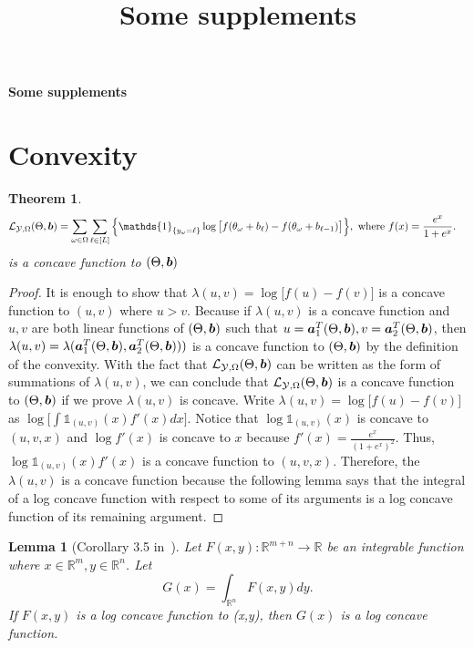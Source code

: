 \documentclass[11pt]{article}
\title{Some supplements}
\theoremstyle{plain}
\newtheorem{thm}{Theorem}[section]
\newtheorem{lem}{Lemma}
\theoremstyle{definition}
\begin{document}
\begin{center}
\begin{spacing}{1.5}
\textbf{\Large Some supplements}
\end{spacing}
\end{center}
\section{Convexity}
\begin{thm}
\begin{align}
 \logl(\Theta, \mb)&=\sum_{\omega\in\Omega}\sum_{\ell\in[L]} \Big\{\mathds{1}_{\{y_\omega=\ell\}} \log \big[f(\theta_\omega+b_\ell)-  f(\theta_\omega+b_{\ell-1})\big]\Big\}, \text{ where } f(x) = \frac{e^x}{1+e^x}.
 \end{align}
is a concave function to $(\Theta,\bm{b})$
\end{thm}
\begin{proof}
It is enough to show that $\lambda(u,v) = \log \big[f(u)-  f(v)\big]$
is a concave function to $(u,v)$ where $u>v$. Because if $\lambda(u,v)$ is a concave function and $u,v$ are both linear functions of $(\Theta,\bm{b}) $ such that $u = \bm{a}_1^T(\Theta,\bm{b}), v = \bm{a}_2^T(\Theta,\bm{b})$, then $\lambda(u,v) = \lambda(\bm{a}_1^T(\Theta,\bm{b}),\bm{a}_2^T(\Theta,\bm{b})))$ is a concave function to $(\Theta,\bm{b})$ by the definition of the convexity. With the fact that  $\mathcal{L}_{\mathcal{Y},\Omega}(\Theta, \bm{b})$
can be written as the form of summations of $\lambda(u,v)$, we can conclude that $\mathcal{L}_{\mathcal{Y},\Omega}(\Theta, \bm{b}) $ is a concave function to $(\Theta,\bm{b})$ if we prove $\lambda(u,v)$ is concave. Write $\lambda(u,v) = \log\big[f(u)-f(v)\big]$ as $\log\big[\int\mathds{1}_{(u,v)}(x)f'(x)dx\big]$. Notice that  $\log\mathds{1}_{(u,v)}(x)$ is concave to $(u,v,x)$ and $\log f'(x)$ is concave to $x$ because $f'(x) = \frac{e^x}{(1+e^x)^2}$. Thus, $\log\mathds{1}_{(u,v)}(x)f'(x)$
is a concave function to $(u,v,x)$. Therefore, the $\lambda(u,v)$ is a concave function because the following lemma says that the integral of a log concave function with respect to some of its arguments is a log concave function of its remaining argument.
\end{proof}

\begin{lem}[Corollary 3.5 in~\cite{brascamp2002extensions}]
Let $F(x,y):\mathbb{R}^{m+n}\rightarrow \mathbb{R}$ be an integrable function where $x\in \mathbb{R}^{m},y\in \mathbb{R}^n$. Let $$G(x) = \int_{\mathbb{R}^n}F(x,y)dy.$$ If $F(x,y)$ is a log concave function to (x,y), then $G(x)$ is a log concave function.
\end{lem}
\end{document}
